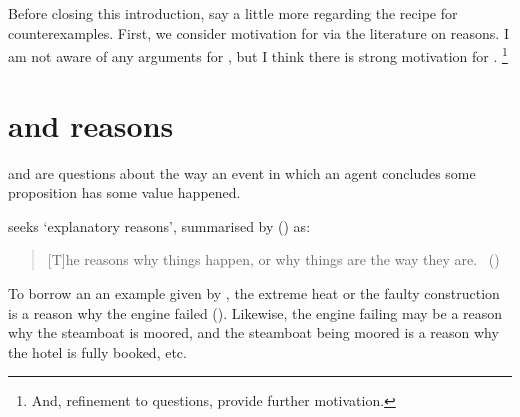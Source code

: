 \begin{note}
  Before closing this introduction, say a little more regarding the recipe for counterexamples.
  First, we consider motivation for \issueInclusion{} via the literature on reasons.
  I am not aware of any arguments for \issueInclusion{}, but I think there is strong motivation for \issueInclusion{}.%
  \footnote{
    \color{red}
    And, refinement to questions, provide further motivation.
  }
\end{note}

\section*{\issueInclusion{} and reasons}
\label{sec:reasons}

\begin{note}
  \qWhy{} and \qHow{} are questions about the way an event in which an agent concludes some proposition has some value happened.

  \qWhy{} seeks `explanatory reasons', summarised by \citeauthor{Hieronymi:2011aa} (\citeyear{Hieronymi:2011aa}) as:

  \begin{quote}
    [T]he reasons why things happen, or why things are the way they are.\newline
    \mbox{ }\hfill\mbox{(\citeyear[410]{Hieronymi:2011aa})}
  \end{quote}

  To borrow an an example given by \citeauthor{Hieronymi:2011aa}, the extreme heat or the faulty construction is a reason why the engine failed (\citeyear[409]{Hieronymi:2011aa}).
  Likewise, the engine failing may be a reason why the steamboat is moored, and the steamboat being moored is a reason why the hotel is fully booked, etc.
\end{note}

